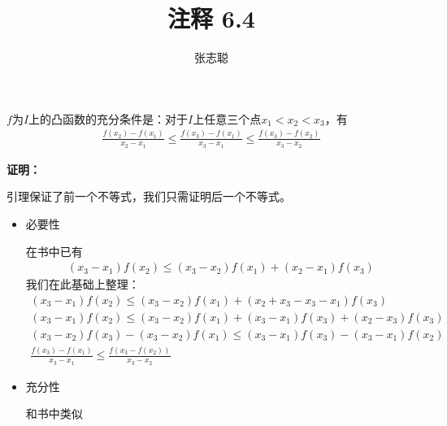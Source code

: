 \documentclass{article}
\begin{document}
\title{注释 6.4}
\author{张志聪}
\maketitle

\begin{zremark}
  $f$为$I$上的凸函数的充分条件是：对于$I$上任意三个点$x_1 < x_2 < x_3$，有
  \begin{align*}
    \frac{f(x_2) - f(x_1)}{x_2 - x_1} \leq \frac{f(x_3) - f(x_1)}{x_3 - x_1} \leq \frac{f(x_3) - f(x_2)}{x_3 - x_2}
  \end{align*}
\end{zremark}

\textbf{证明：}

引理保证了前一个不等式，我们只需证明后一个不等式。

\begin{itemize}
  \item 必要性

        在书中已有
        \begin{align*}
          (x_3 - x_1) f(x_2) \leq (x_3 - x_2)f(x_1) + (x_2 - x_1)f(x_3)
        \end{align*}
        我们在此基础上整理：
        \begin{align*}
          (x_3 - x_1) f(x_2) \leq (x_3 - x_2)f(x_1) + (x_2 + x_3 - x_3 - x_1)f(x_3)          \\
          (x_3 - x_1) f(x_2) \leq (x_3 - x_2)f(x_1) + (x_3 - x_1)f(x_3) + (x_2 - x_3)f(x_3)  \\
          (x_3 - x_2)f(x_3) - (x_3 - x_2)f(x_1) \leq  (x_3 - x_1)f(x_3) - (x_3 - x_1) f(x_2) \\
          \frac{f(x_3) - f(x_1)}{x_3 - x_1} \leq \frac{f(x_3 - f(x_2))}{x_3 - x_2}
        \end{align*}

  \item 充分性

        和书中类似

\end{itemize}
\end{document}
